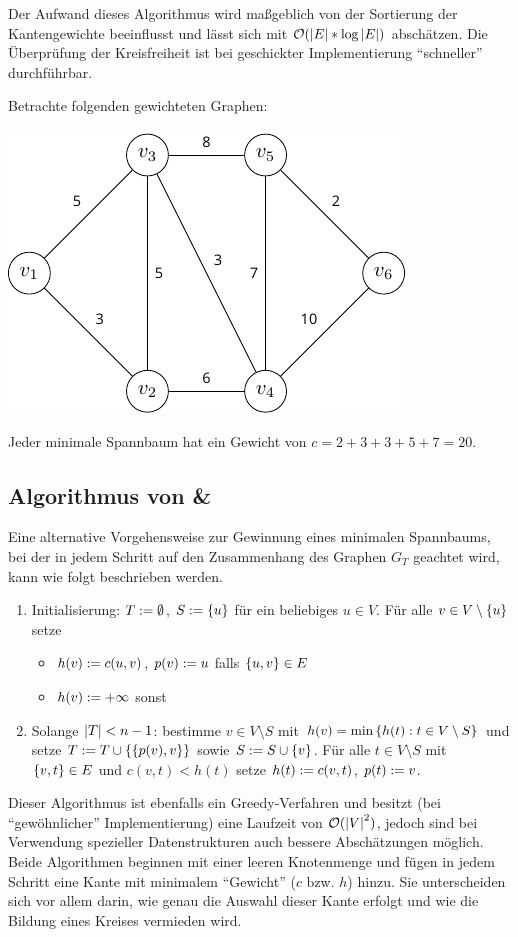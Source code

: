 Der Aufwand dieses Algorithmus wird maßgeblich von der Sortierung der Kantengewichte beeinflusst und lässt sich mit $\mathcal{O}(\left| E \right| * \log\left| E \right|)$ abschätzen. Die Überprüfung der Kreisfreiheit ist bei geschickter Implementierung \enquote{schneller} durchführbar.

\begin{beispiel}
	Betrachte folgenden gewichteten Graphen:
	\begin{center}
		\includegraphics[width=.3\textwidth]{optinum_abb/optinum_5_2_bsp5-1.pdf}
	\end{center}
	
	Jeder minimale Spannbaum hat ein Gewicht von $c = 2+3+3+5+7 = 20$.
\end{beispiel}

\subsection{Algorithmus von  \& }

Eine alternative Vorgehensweise zur Gewinnung eines minimalen Spannbaums, bei der in jedem Schritt auf den Zusammenhang des Graphen $G_T$ geachtet wird, kann wie folgt beschrieben werden.

\begin{enumerate}[label=Schritt \arabic*:, leftmargin=*, start=0]
	\item Initialisierung: $T \mathrel{:=} \emptyset$, $S \mathrel{:=} \left\{ u \right\}$ für ein beliebiges $u \in V$. Für alle $v \in V \setminus \left\{ u \right\}$ setze
	\begin{itemize}[nolistsep, topsep=-\parskip]
		\item $h(v) \mathrel{:=} c(u,v)$, $p(v) \mathrel{:=} u$ \hspace{1em} falls $\left\{ u,v \right\} \in E$
		\item $h(v) \mathrel{:=} + \infty$ \hspace{1em} sonst
	\end{itemize}
	\item Solange $\left| T \right| < n -1$: bestimme $v \in V \setminus S$ mit $h(v) = \min\left\{ h(t) : t \in V \setminus S \right\}$ und setze $T \mathrel{:=} T \cup \left\{ \left\{ p(v),v \right\} \right\}$ sowie $S \mathrel{:=} S \cup \left\{ v \right\}$. Für alle $t \in V \setminus S$ mit $\left\{ v,t \right\} \in E$ und $c(v,t) < h(t)$ setze $h(t) \mathrel{:=} c(v,t)$, $p(t) \mathrel{:=} v$.
\end{enumerate}

Dieser Algorithmus ist ebenfalls ein Greedy-Verfahren und besitzt (bei \enquote{gewöhnlicher} Implementierung) eine Laufzeit von $\mathcal{O}(\left| V \right|^2)$, jedoch sind bei Verwendung spezieller Datenstrukturen auch bessere Abschätzungen möglich. Beide Algorithmen beginnen mit einer leeren Knotenmenge und fügen in jedem Schritt eine Kante mit minimalem \enquote{Gewicht} ($c$ bzw. $h$) hinzu. Sie unterscheiden sich vor allem darin, wie genau die Auswahl dieser Kante erfolgt und wie die Bildung eines Kreises vermieden wird.

